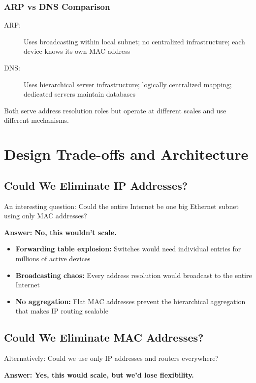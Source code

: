 \documentclass[../../compsys.tex]{subfiles}
\begin{document}
\subsubsection{ARP vs DNS Comparison}

\begin{description}
    \item[ARP:] Uses broadcasting within local subnet; no centralized infrastructure; each device knows its own MAC address
    \item[DNS:] Uses hierarchical server infrastructure; logically centralized mapping; dedicated servers maintain databases
\end{description}

Both serve address resolution roles but operate at different scales and use different mechanisms.

\section{Design Trade-offs and Architecture}

\subsection{Could We Eliminate IP Addresses?}

An interesting question: Could the entire Internet be one big Ethernet subnet using only MAC addresses?

\textbf{Answer: No, this wouldn't scale.}

\begin{itemize}
    \item \textbf{Forwarding table explosion:} Switches would need individual entries for millions of active devices
    \item \textbf{Broadcasting chaos:} Every address resolution would broadcast to the entire Internet
    \item \textbf{No aggregation:} Flat MAC addresses prevent the hierarchical aggregation that makes IP routing scalable
\end{itemize}

\subsection{Could We Eliminate MAC Addresses?}

Alternatively: Could we use only IP addresses and routers everywhere?

\textbf{Answer: Yes, this would scale, but we'd lose flexibility.}
\end{document}
